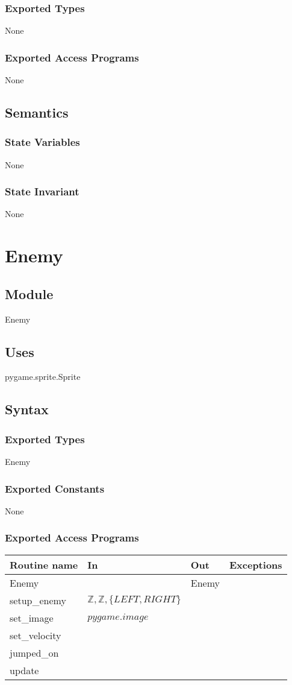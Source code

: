 \documentclass[12pt]{article}
\begin{document}
\subsubsection* {Exported Types}
None
\subsubsection* {Exported Access Programs}
None
\subsection* {Semantics}
\subsubsection* {State Variables}
None
\subsubsection* {State Invariant}
None
\newpage

\section* {Enemy}
\subsection* {Module}
Enemy
\subsection* {Uses}
pygame.sprite.Sprite
\subsection* {Syntax}
\subsubsection* {Exported Types}
Enemy
\subsubsection* {Exported Constants}
None
\subsubsection* {Exported Access Programs}
\begin{tabular}{| l | l | l | p{3.5cm} |}
\hline
\textbf{Routine name} & \textbf{In} & \textbf{Out} & \textbf{Exceptions}\\
\hline
Enemy & ~ & Enemy & ~\\
\hline
setup\_enemy & $\mathbb{Z},\mathbb{Z},\{LEFT, RIGHT\}$ & ~ & ~\\
\hline
set\_image & $pygame.image$ & ~ & ~\\
\hline
set\_velocity & ~ & ~ & ~\\
\hline
jumped\_on & ~ & ~ & ~\\
\hline
update & ~ & ~\\
\hline
\end{tabular}
\end{document}

